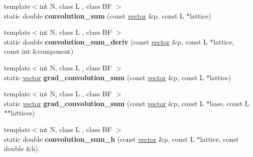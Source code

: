 \begin{DoxyCompactItemize}
\mbox{\label{classsisl_1_1tp__quadratic_a850082ac2adb0124b7994c18af6dcc53}} 
{\footnotesize template$<$int N, class L , class BF $>$ }\\static double {\bfseries convolution\+\_\+sum} (const \hyperlink{namespacesisl_a2069bd5374a9be042ff3ce3306d41e1a}{vector} \&p, const L $\ast$lattice)
\item 
\mbox{\label{classsisl_1_1tp__quadratic_a7280d1af6563968684553ee3b99dd0f1}} 
{\footnotesize template$<$int N, class L , class BF $>$ }\\static double {\bfseries convolution\+\_\+sum\+\_\+deriv} (const \hyperlink{namespacesisl_a2069bd5374a9be042ff3ce3306d41e1a}{vector} \&p, const L $\ast$lattice, const int \&component)
\item 
\mbox{\label{classsisl_1_1tp__quadratic_a2243705ea86692e64149d82e88a0e0fc}} 
{\footnotesize template$<$int N, class L , class BF $>$ }\\static \hyperlink{namespacesisl_a2069bd5374a9be042ff3ce3306d41e1a}{vector} {\bfseries grad\+\_\+convolution\+\_\+sum} (const \hyperlink{namespacesisl_a2069bd5374a9be042ff3ce3306d41e1a}{vector} \&p, const L $\ast$lattice)
\item 
\mbox{\label{classsisl_1_1tp__quadratic_afe95f0af6e952f68ca431ef619824829}} 
{\footnotesize template$<$int N, class L , class BF $>$ }\\static \hyperlink{namespacesisl_a2069bd5374a9be042ff3ce3306d41e1a}{vector} {\bfseries grad\+\_\+convolution\+\_\+sum} (const \hyperlink{namespacesisl_a2069bd5374a9be042ff3ce3306d41e1a}{vector} \&p, const L $\ast$base, const L $\ast$$\ast$lattices)
\item 
\mbox{\label{classsisl_1_1tp__quadratic_a86821dd0fec5985b5d24a753168f3db7}} 
{\footnotesize template$<$int N, class L , class BF $>$ }\\static double {\bfseries convolution\+\_\+sum\+\_\+h} (const \hyperlink{namespacesisl_a2069bd5374a9be042ff3ce3306d41e1a}{vector} \&p, const L $\ast$lattice, const double \&h)
\item 
\mbox{\label{classsisl_1_1tp__quadratic_a6e136b55112a47e19693c20b0c8d685f}} 
$$
\end{DoxyCompactItemize}
